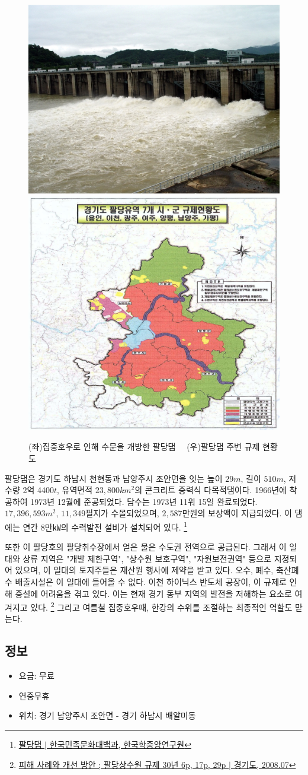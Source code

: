  
\begin{figure}
   \centering
   \includegraphics[width=.4\textwidth]{img/팔당댐.jpg}
   \includegraphics[width=.4\textwidth]{img/규제현황도.PNG}
    
   \caption{(좌)집중호우로 인해 수문을 개방한 팔당댐\protect\footnotemark $\quad$ (우)팔당댐 주변 규제 현황도\protect\footnotemark}
   \label{fig:my_labe9}
\end{figure}
\footnotetext{\ref{paldang}}


팔당댐은 경기도 하남시 천현동과 남양주시 조안면을 잇는
높이 $29m$, 길이 $510m$, 저수량 2억 4400$t$, 유역면적 $23,800km^2$의 콘크리트 중력식 다목적댐이다.
1966년에 착공하여 1973년 12월에 준공되었다.
담수는 1973년 11워 15일 완료되었다.
$17,396,593 m^2$, $11,349$필지가 수몰되었으며, $2,587$만원의 보상액이 지급되었다.
이 댐에는 연간 8만㎾의 수력발전 설비가 설치되어 있다.
\footnote{\href{https://terms.naver.com/entry.naver?docId=531161&cid=46631&categoryId=46631}{팔당댐 $|$ 한국민족문화대백과, 한국학중앙연구원}}


또한 이 팔당호의 팔당취수장에서 얻은 물은 수도권 전역으로 공급된다.
그래서 이 일대와 상류 지역은 "개발 제한구역", "상수원 보호구역", "자원보전권역" 
등으로 지정되어 있으며,
이 일대의 토지주들은 재산원 행사에 제약을 받고 있다.
오수, 폐수, 축산폐수 배출시설은 이 일대에 들어올 수 없다.
이천 하이닉스 반도체 공장이, 이 규제로 인해 증설에 어려움을 겪고 있다.
이는 현재 경기 동부 지역의 발전을 저해하는 요소로 여겨지고 있다.
\footnote{\label{paldang}\href{https://memory.library.kr/items/show/37492}{피해 사례와 개선 방안 ; 팔당상수원 규제 30년 6p, 17p, 29p $|$ 경기도, 2008.07}}
그리고 여름철 집중호우때, 한강의 수위를 조절하는 최종적인 역할도 맏는다.

\subsection{정보}
\begin{itemize}
    \item 요금: 무료
    \item 연중무휴
    \item 위치: 경기 남양주시 조안면 - 경기 하남시 배알미동
\end{itemize}